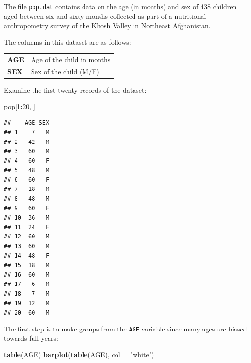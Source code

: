 \documentclass[12pt,a4paper]{book}
\newenvironment{Shaded}{\begin{snugshade}}{\end{snugshade}}
\newcommand{\DataTypeTok}[1]{\textcolor[rgb]{0.13,0.29,0.53}{#1}}
\newcommand{\DecValTok}[1]{\textcolor[rgb]{0.00,0.00,0.81}{#1}}
\newcommand{\KeywordTok}[1]{\textcolor[rgb]{0.13,0.29,0.53}{\textbf{#1}}}
\newcommand{\NormalTok}[1]{#1}
\newcommand{\OperatorTok}[1]{\textcolor[rgb]{0.81,0.36,0.00}{\textbf{#1}}}
\newcommand{\StringTok}[1]{\textcolor[rgb]{0.31,0.60,0.02}{#1}}
\theoremstyle{definition}
\theoremstyle{definition}
\theoremstyle{definition}
\theoremstyle{remark}
\begin{document}
The file \texttt{pop.dat} contains data on the age (in months) and sex
of 438 children aged between six and sixty months collected as part of a
nutritional anthropometry survey of the Khosh Valley in Northeast
Afghanistan.

The columns in this dataset are as follows:

\begin{longtable}[]{@{}ll@{}}
\toprule
\endhead
\begin{minipage}[t]{0.14\columnwidth}\raggedright
\textbf{AGE}\strut
\end{minipage} & \begin{minipage}[t]{0.38\columnwidth}\raggedright
Age of the child in months\strut
\end{minipage}\tabularnewline
\begin{minipage}[t]{0.14\columnwidth}\raggedright
\textbf{SEX}\strut
\end{minipage} & \begin{minipage}[t]{0.38\columnwidth}\raggedright
Sex of the child (M/F)\strut
\end{minipage}\tabularnewline
\bottomrule
\end{longtable}

Examine the first twenty records of the dataset:

\begin{Shaded}
\begin{Highlighting}[]
\NormalTok{pop[}\DecValTok{1}\OperatorTok{:}\DecValTok{20}\NormalTok{, ]}
\end{Highlighting}
\end{Shaded}

\begin{verbatim}
##    AGE SEX
## 1    7   M
## 2   42   M
## 3   60   M
## 4   60   F
## 5   48   M
## 6   60   F
## 7   18   M
## 8   48   M
## 9   60   F
## 10  36   M
## 11  24   F
## 12  60   M
## 13  60   M
## 14  48   F
## 15  18   M
## 16  60   M
## 17   6   M
## 18   7   M
## 19  12   M
## 20  60   M
\end{verbatim}

The first step is to make groups from the \texttt{AGE} variable since
many ages are biased towards full years:

\begin{Shaded}
\begin{Highlighting}[]
\KeywordTok{table}\NormalTok{(AGE)}
\KeywordTok{barplot}\NormalTok{(}\KeywordTok{table}\NormalTok{(AGE), }\DataTypeTok{col =} \StringTok{"white"}\NormalTok{)}
\end{Highlighting}
\end{Shaded}
\end{document}
